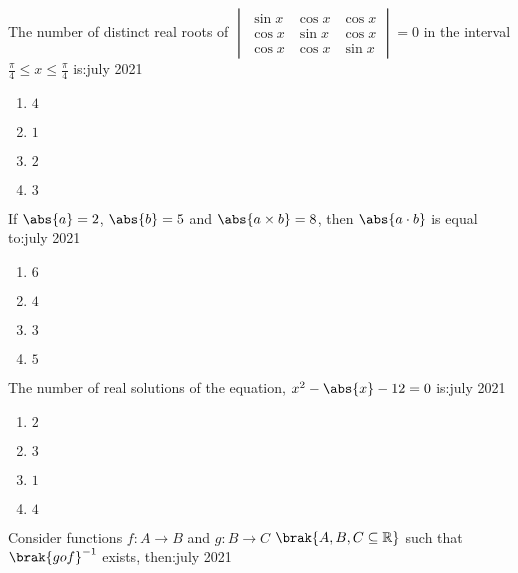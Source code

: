     \item The number of distinct real roots of $\begin{vmatrix}\sin x & \cos x & \cos x \\ \cos x & \sin x & \cos x \\ \cos x & \cos x & \sin x\end{vmatrix}=0$ in the interval $\frac{\pi}{4}\le x\le\frac{\pi}{4}$ is:\hfill{july 2021}

        \begin{multicols}{4}
        \begin{enumerate}
        \item $4$
        \item $1$
        \item $2$
        \item $3$
        \end{enumerate}
        \end{multicols}

    \item If $\abs{a}=2$, $\abs{b}=5$ and $\abs{a\times b}=8$, then $\abs{a\cdot b}$ is equal to:\hfill{july 2021}

        \begin{multicols}{4}
        \begin{enumerate}
        \item $6$
        \item $4$
        \item $3$
        \item $5$
        \end{enumerate}
        \end{multicols}

    \item The number of real solutions of the equation, $x^2-\abs{x}-12=0$ is:\hfill{july 2021}

        \begin{multicols}{4}
        \begin{enumerate}
        \item $2$
        \item $3$
        \item $1$
        \item $4$
        \end{enumerate}
        \end{multicols}

    \item Consider functions $f:A\rightarrow B$ and $g:B\rightarrow C$ $\brak{A,B,C\subseteq\mathbb{R}}$ such that $\brak{gof}^{-1}$ exists, then:\hfill{july 2021}

